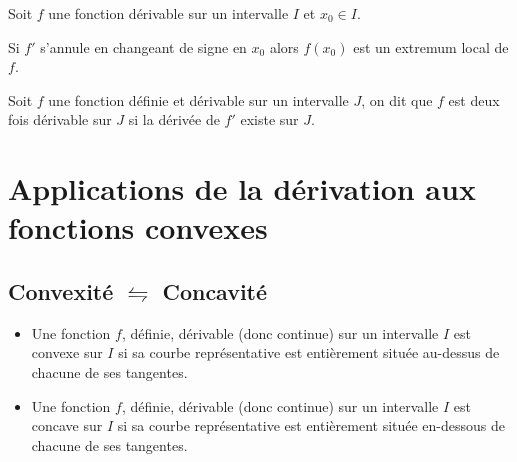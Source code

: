 \documentclass[french]{book}
\begin{document}
\begin{prop}
Soit $f$ une fonction dérivable sur un intervalle $I$ et $x_{0}\in I$.

Si $f'$ s'annule en changeant de signe en $x_{0}$ alors $f(x_{0})$ est un extremum local de $f$.
\end{prop}


\begin{defn}
Soit $f$ une fonction définie et dérivable sur un intervalle $J$, on dit que $f$ est deux fois dérivable sur $J$ si la dérivée de $f'$ existe sur $J$. 
\end{defn}

\newpage

\section{Applications de la dérivation aux fonctions convexes}
\subsection{Convexité $ \leftrightharpoons$ Concavité}

\begin{defn}
\begin{itemize}
\item[$\bullet$] Une fonction $f$, définie, dérivable (donc continue) sur un intervalle $I$ est convexe sur $I$ si sa courbe représentative est entièrement située au-dessus de chacune de ses tangentes.\\

\item[$\bullet$] Une fonction $f$, définie, dérivable (donc continue) sur un intervalle $I$ est concave sur $I$ si sa courbe représentative est entièrement située en-dessous de chacune de ses tangentes.
\end{itemize}
\end{defn}
\end{document}
